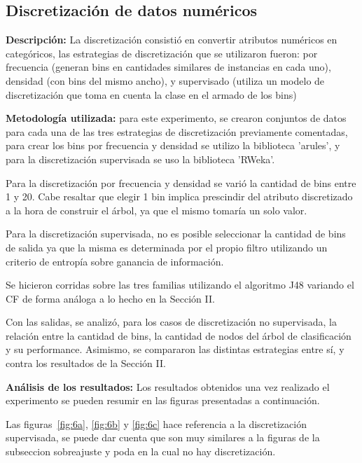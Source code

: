 \subsection{Discretización de datos numéricos}

\textbf{Descripción:} La discretización consistió en convertir atributos numéricos en categóricos, las estrategias
de discretización que se utilizaron fueron: por frecuencia (generan bins en cantidades similares de instancias en cada uno),  densidad
(con bins del mismo ancho), y supervisado (utiliza un modelo de discretización que toma en cuenta la clase en
el armado de los bins) 

\textbf{Metodología utilizada:} para este experimento, se crearon conjuntos de datos para cada
una de las tres estrategias de discretización previamente comentadas, para crear los bins por frecuencia
y densidad se utilizo la biblioteca 'arules', y para la discretización supervisada
se uso la biblioteca 'RWeka'.  

Para la discretización por frecuencia y densidad se varió la cantidad de bins entre 1 y 20.
Cabe resaltar que elegir 1 bin implica prescindir del atributo discretizado a la hora de
construir el árbol, ya que el mismo tomaría un solo valor.

Para la discretización supervisada, no es posible seleccionar la cantidad de bins de salida
ya que la misma es determinada por el propio filtro utilizando un criterio de entropía sobre
ganancia de información.

Se hicieron corridas sobre las tres familias utilizando el algoritmo J48 variando el CF de
forma análoga a lo hecho en la Sección II.

Con las salidas, se analizó, para los casos de discretización no supervisada, la relación
entre la cantidad de bins, la cantidad de nodos del árbol de clasificación y su performance.
Asimismo, se compararon las distintas estrategias entre sí, y contra los resultados de la
Sección II.

\textbf{Análisis de los resultados:} Los resultados obtenidos una vez realizado el experimento
se pueden resumir en las figuras presentadas a continuación.

Las figuras~\ref{fig:6a}, \ref{fig:6b} y \ref{fig:6c} hace referencia a la discretización supervisada, se puede
dar cuenta que son muy similares a la figuras de la subseccion sobreajuste y poda en la cual no hay discretización.


